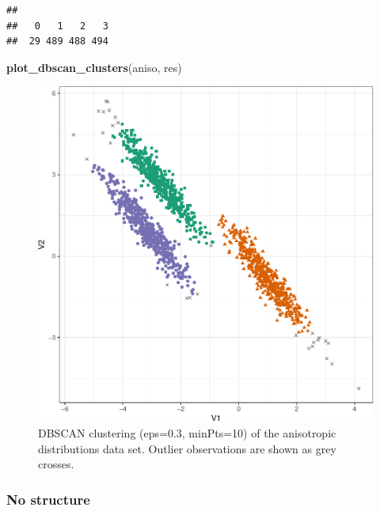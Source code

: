 \documentclass[]{book}
\newenvironment{Shaded}{\begin{snugshade}}{\end{snugshade}}
\newcommand{\KeywordTok}[1]{\textcolor[rgb]{0.13,0.29,0.53}{\textbf{{#1}}}}
\newcommand{\DataTypeTok}[1]{\textcolor[rgb]{0.13,0.29,0.53}{{#1}}}
\newcommand{\DecValTok}[1]{\textcolor[rgb]{0.00,0.00,0.81}{{#1}}}
\newcommand{\FloatTok}[1]{\textcolor[rgb]{0.00,0.00,0.81}{{#1}}}
\newcommand{\StringTok}[1]{\textcolor[rgb]{0.31,0.60,0.02}{{#1}}}
\newcommand{\NormalTok}[1]{{#1}}
\theoremstyle{definition}
\theoremstyle{definition}
\theoremstyle{definition}
\theoremstyle{remark}
\begin{document}
\begin{Shaded}
\end{Shaded}

\begin{verbatim}
## 
##   0   1   2   3 
##  29 489 488 494
\end{verbatim}

\begin{Shaded}
\begin{Highlighting}[]
\KeywordTok{plot_dbscan_clusters}\NormalTok{(aniso, res)}
\end{Highlighting}
\end{Shaded}

\begin{figure}

{\centering \includegraphics[width=0.6\linewidth]{09-clustering_files/figure-latex/anisoDBSCANscatter-1} 

}

\caption{DBSCAN clustering (eps=0.3, minPts=10) of the anisotropic distributions data set. Outlier observations are shown as grey crosses.}\label{fig:anisoDBSCANscatter}
\end{figure}

\subsubsection{No structure}\label{no-structure-1}
\end{document}
